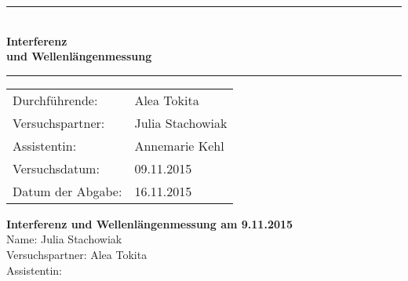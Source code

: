 \documentclass[12pt,a4paper,titlepage,headinclude,bibtotoc]{scrartcl}
\begin{document}
\begin{titlepage}

\vspace*{3cm}

\rule{\textwidth}{1pt}\\[0.5cm]
{\huge \bfseries
  Interferenz\\[1.5ex]
  und Wellenlängenmessung}\\[0.5cm]
\rule{\textwidth}{1pt}

\vspace*{3cm}

\begin{Large}
\begin{tabular}{ll}
Durchführende: &  Alea Tokita\\
Versuchspartner: &  Julia Stachowiak\\
Assistentin: & Annemarie Kehl\\
 Versuchsdatum: & 09.11.2015\\
 Datum der Abgabe: & 16.11.2015\\
\end{tabular}
\end{Large}

\vspace*{0.8cm}


\end{titlepage}

\tableofcontents

\newpage


\textbf{Interferenz und Wellenlängenmessung am 9.11.2015} \\

Name: Julia Stachowiak \\
Versuchspartner: Alea Tokita \\
Assistentin: \\ \\
\end{document}
